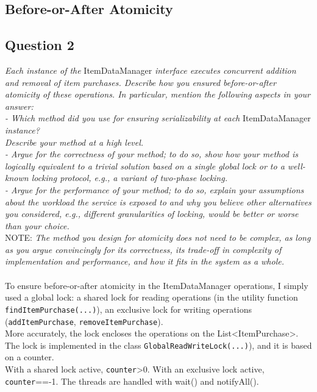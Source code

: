 \documentclass[paper=a4, fontsize=11pt]{scrartcl} %
\numberwithin{equation}{section} %
\numberwithin{figure}{section} %
\numberwithin{table}{section} %
\begin{document}
 \clearpage
 
\subsection{Before-or-After Atomicity}

\subsection{Question 2}

\textit{Each instance of the }ItemDataManager\textit{ interface executes
concurrent addition and removal of item purchases. Describe how you ensured before-or-after atomicity
of these operations. In particular, mention the following aspects in your answer:}\\
\textit{- Which method did you use for ensuring serializability at each }ItemDataManager\textit{ instance?}\\
\textit{Describe your method at a high level.}\\
\textit{- Argue for the correctness of your method; to do so, show how your method is logically equivalent
to a trivial solution based on a single global lock or to a well-known locking protocol, e.g., a
variant of two-phase locking.\\
- Argue for the performance of your method; to do so, explain your assumptions about the
workload the service is exposed to and why you believe other alternatives you considered, e.g.,
different granularities of locking, would be better or worse than your choice.\\}
NOTE:\textit{ The method you design for atomicity does not need to be complex, as long as you argue
convincingly for its correctness, its trade-off in complexity of implementation and performance, and how
it fits in the system as a whole.}\\
~\\
To ensure before-or-after atomicity in the ItemDataManager operations, I simply used a global lock: a shared lock for reading operations (in the utility function \verb|findItemPurchase(...)|), an exclusive lock for writing operations (\verb|addItemPurchase|, \verb!removeItemPurchase!).\\ More accurately, the lock encloses the operations on the List<ItemPurchase>.\\
The lock is implemented in the class \verb|GlobalReadWriteLock(...)|), and it is based on a counter.\\
With a shared lock active, \verb!counter!>0. With an exclusive lock active, \verb!counter!==-1. The threads are handled with wait() and notifyAll().\\
\end{document}
